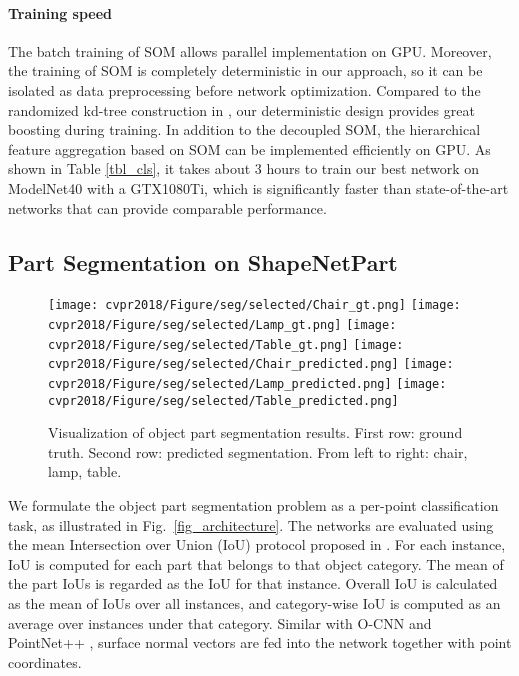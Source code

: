 \documentclass[10pt,twocolumn,letterpaper]{article}
\begin{document}
\paragraph{Training speed}
The batch training of SOM allows parallel implementation on GPU. Moreover, the training of SOM is completely deterministic in our approach, so it can be isolated as data preprocessing before network optimization. Compared to the randomized kd-tree construction in \cite{klokov2017escape}, our deterministic design provides great boosting during training. In addition to the decoupled SOM, the hierarchical feature aggregation based on SOM can be implemented efficiently on GPU. As shown in Table \ref{tbl_cls}, it takes about 3 hours to train our best network on ModelNet40 with a GTX1080Ti, which is significantly faster than state-of-the-art networks that can provide comparable performance.




\subsection{Part Segmentation on ShapeNetPart} \label{sec_exp_seg}
\begin{figure}[h] 
        \centering
        \texttt{[image: cvpr2018/Figure/seg/selected/Chair\_gt.png]}
        \texttt{[image: cvpr2018/Figure/seg/selected/Lamp\_gt.png]}
        \texttt{[image: cvpr2018/Figure/seg/selected/Table\_gt.png]}
        \texttt{[image: cvpr2018/Figure/seg/selected/Chair\_predicted.png]}
        \texttt{[image: cvpr2018/Figure/seg/selected/Lamp\_predicted.png]}
        \texttt{[image: cvpr2018/Figure/seg/selected/Table\_predicted.png]}
        \caption{Visualization of object part segmentation results. First row: ground truth. Second row: predicted segmentation. From left to right: chair, lamp, table. }
        \label{fig_seg_selected}
        \vspace{-4pt}
\end{figure}
We formulate the object part segmentation problem as a per-point classification task, as illustrated in Fig.~\ref{fig_architecture}. The networks are evaluated using the mean Intersection over Union (IoU) protocol proposed in \cite{qi2016pointnet}. For each instance, IoU is computed for each part that belongs to that object category. The mean of the part IoUs is regarded as the IoU for that instance. Overall IoU is calculated as the mean of IoUs over all instances, and category-wise IoU is computed as an average over instances under that category. Similar with O-CNN \cite{wang2017cnn} and PointNet++ \cite{qi2017pointnet++}, surface normal vectors are fed into the network together with point coordinates.
\end{document}

